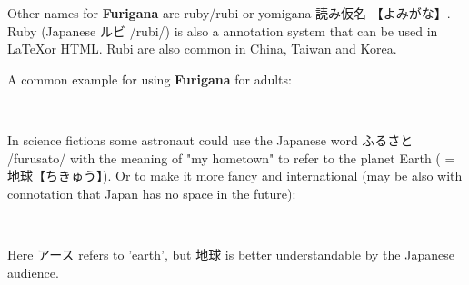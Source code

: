 Other names for \textbf{Furigana} are ruby/rubi or yomigana {読み仮名}
{【よみがな】}.  Ruby (Japanese {ルビ} /rubi/) is also a annotation system that
can be used in \LaTeX or HTML. Rubi are  also common in China, Taiwan and
Korea. 

A common example for using \textbf{Furigana} for adults:

\begin{center}
\Huge {}　
\end{center}

In science fictions some astronaut could use the Japanese word {ふるさと}
/furusato/  with the meaning of "my hometown" to refer to the planet Earth ( =
{地球}{【ちきゅう】}). Or to make it more fancy and international (may be also
with connotation that Japan has no space in the future):

\begin{center}
\Huge {}　
\end{center}

Here {アース} refers to 'earth', but {地球} is better understandable by the
Japanese audience.

